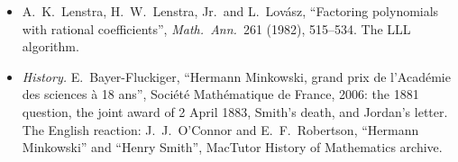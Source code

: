 \begin{itemize}
conjecture. The Davenport--Heilbronn count is in the sources of Chapter~3.
\item A.~K.~Lenstra, H.~W.~Lenstra, Jr.\ and L.~Lov\'asz, ``Factoring polynomials with rational coefficients'',
\emph{Math.\ Ann.}\ 261 (1982), 515--534. The LLL algorithm.
\item \emph{History.} E.~Bayer-Fluckiger, ``Hermann Minkowski, grand prix de l'Acad\'emie des sciences \`a 18 ans'',
Soci\'et\'e Math\'ematique de France, 2006: the 1881 question, the joint award of 2 April 1883, Smith's death, and Jordan's
letter. The English reaction: J.~J.~O'Connor and E.~F.~Robertson, ``Hermann Minkowski'' and ``Henry Smith'', MacTutor
History of Mathematics archive.
\end{itemize}
